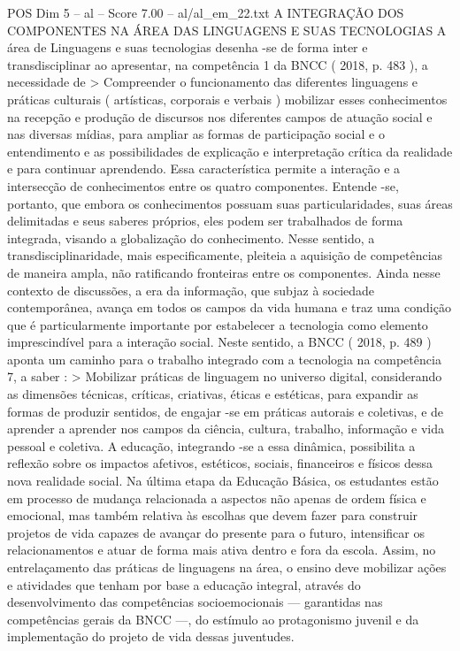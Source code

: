 \begin{textsample}{POS Dim 5 – al – Score 7.00 – al/al\_em\_22.txt}  \label{ex:f5_pos_049}
A INTEGRAÇÃO DOS COMPONENTES NA ÁREA DAS LINGUAGENS E SUAS TECNOLOGIAS A área de Linguagens e suas tecnologias desenha -se de forma inter e transdisciplinar ao apresentar, na competência 1 da BNCC ( 2018, p. 483 ), a necessidade de > Compreender o funcionamento das diferentes linguagens e práticas culturais ( artísticas, corporais e verbais ) mobilizar esses conhecimentos na recepção e produção de discursos nos diferentes campos de atuação social e nas diversas mídias, para ampliar as formas de participação social e o entendimento e as possibilidades de explicação e interpretação crítica da realidade e para continuar aprendendo.
Essa característica permite a interação e a intersecção de conhecimentos entre os quatro componentes.
Entende -se, portanto, que embora os conhecimentos possuam suas particularidades, suas áreas delimitadas e seus saberes próprios, eles podem ser trabalhados de forma integrada, visando a globalização do conhecimento.
Nesse sentido, a transdisciplinaridade, mais especificamente, pleiteia a aquisição de competências de maneira ampla, não ratificando fronteiras entre os componentes.
Ainda nesse contexto de discussões, a era da informação, que subjaz à sociedade contemporânea, avança em todos os campos da vida humana e traz uma condição que é particularmente importante por estabelecer a tecnologia como elemento imprescindível para a interação social.
Neste sentido, a BNCC ( 2018, p. 489 ) aponta um caminho para o trabalho integrado com a tecnologia na competência 7, a saber : > Mobilizar práticas de linguagem no universo digital, considerando as dimensões técnicas, críticas, criativas, éticas e estéticas, para expandir as formas de produzir sentidos, de engajar -se em práticas autorais e coletivas, e de aprender a aprender nos campos da ciência, cultura, trabalho, informação e vida pessoal e coletiva.
A educação, integrando -se a essa dinâmica, possibilita a reflexão sobre os impactos afetivos, estéticos, sociais, financeiros e físicos dessa nova realidade social.
Na última etapa da Educação Básica, os estudantes estão em processo de mudança relacionada a aspectos não apenas de ordem física e emocional, mas também relativa às escolhas que devem fazer para construir projetos de vida capazes de avançar do presente para o futuro, intensificar os relacionamentos e atuar de forma mais ativa dentro e fora da escola.
Assim, no entrelaçamento das práticas de linguagens na área, o ensino deve mobilizar ações e atividades que tenham por base a educação integral, através do desenvolvimento das competências socioemocionais — garantidas nas competências gerais da BNCC —, do estímulo ao protagonismo juvenil e da implementação do projeto de vida dessas juventudes.

\end{textsample}
